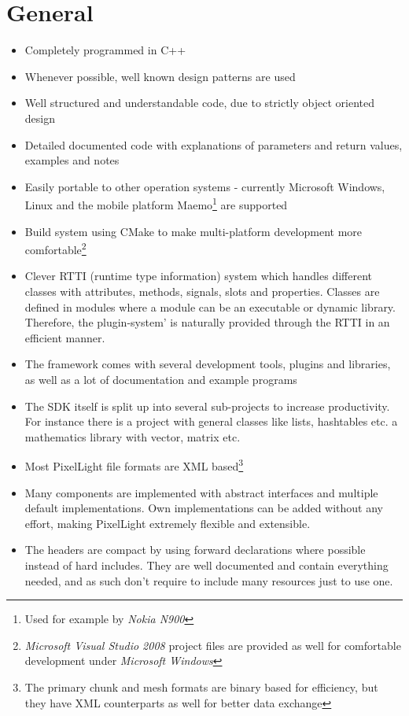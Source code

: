 \section{General}
\begin{itemize}
\item{Completely programmed in C++}
\item{Whenever possible, well known design patterns are used}
\item{Well structured and understandable code, due to strictly object oriented design}
\item{Detailed documented code with explanations of parameters and return values, examples and notes}
\item{Easily portable to other operation systems - currently Microsoft Windows, Linux and the mobile platform Maemo\footnote{Used for example by \emph{Nokia N900}} are supported}
\item{Build system using CMake to make multi-platform development more comfortable\footnote{\emph{Microsoft Visual Studio 2008} project files are provided as well for comfortable development under \emph{Microsoft Windows}}}
\item{Clever RTTI (runtime type information) system which handles different classes with attributes, methods, signals, slots and properties. Classes are defined in modules where a module can be an executable or dynamic library. Therefore, the plugin-system' is naturally provided through the RTTI in an efficient manner.}
\item{The framework comes with several development tools, plugins and libraries, as well as a lot of documentation and example programs}
\item{The SDK itself is split up into several sub-projects to increase productivity. For instance there is a project with general classes like lists, hashtables etc. a mathematics library with vector, matrix etc.}
\item{Most PixelLight file formats are XML based\footnote{The primary chunk and mesh formats are binary based for efficiency, but they have XML counterparts as well for better data exchange}}
\item{Many components are implemented with abstract interfaces and multiple default implementations. Own implementations can be added without any effort, making PixelLight extremely flexible and extensible.}
\item{The headers are compact by using forward declarations where possible instead of hard includes. They are well documented and contain everything needed, and as such don't require to include many resources just to use one.}
\end{itemize}





